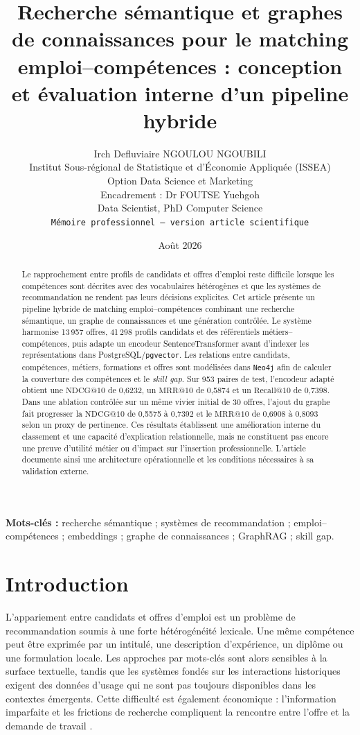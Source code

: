 \documentclass[10pt]{article}
\title{\textbf{Recherche sémantique et graphes de connaissances pour le matching emploi--compétences : conception et évaluation interne d'un pipeline hybride}}
\author{Irch Defluviaire NGOULOU NGOUBILI\\
\small Institut Sous-régional de Statistique et d'Économie Appliquée (ISSEA)\\
\small Option Data Science et Marketing\\
\small Encadrement : Dr FOUTSE Yuehgoh\\
\small Data Scientist, PhD Computer Science\\
\small \texttt{Mémoire professionnel -- version article scientifique}}
\date{Août 2026}
\makeatletter
\newcommand{\pgvector}{\texttt{pgvector}}
\newcommand{\neo}{\texttt{Neo4j}}
\newcommand{\ndcg}{\ensuremath{\mathrm{NDCG@10}}}
\newcommand{\mrr}{\ensuremath{\mathrm{MRR@10}}}
\newcommand{\recall}{\ensuremath{\mathrm{Recall@10}}}
\makeatother
\begin{document}
\maketitle

\begin{abstract}
Le rapprochement entre profils de candidats et offres d'emploi reste difficile lorsque les compétences sont décrites avec des vocabulaires hétérogènes et que les systèmes de recommandation ne rendent pas leurs décisions explicites. Cet article présente un pipeline hybride de matching emploi--compétences combinant une recherche sémantique, un graphe de connaissances et une génération contrôlée. Le système harmonise 13\,957 offres, 41\,298 profils candidats et des référentiels métiers--compétences, puis adapte un encodeur SentenceTransformer avant d'indexer les représentations dans PostgreSQL/\pgvector{}. Les relations entre candidats, compétences, métiers, formations et offres sont modélisées dans \neo{} afin de calculer la couverture des compétences et le \textit{skill gap}. Sur 953 paires de test, l'encodeur adapté obtient une \ndcg{} de 0,6232, un \mrr{} de 0,5874 et un \recall{} de 0,7398. Dans une ablation contrôlée sur un même vivier initial de 30 offres, l'ajout du graphe fait progresser la \ndcg{} de 0,5575 à 0,7392 et le \mrr{} de 0,6908 à 0,8093 selon un proxy de pertinence. Ces résultats établissent une amélioration interne du classement et une capacité d'explication relationnelle, mais ne constituent pas encore une preuve d'utilité métier ou d'impact sur l'insertion professionnelle. L'article documente ainsi une architecture opérationnelle et les conditions nécessaires à sa validation externe.
\end{abstract}

\noindent\textbf{Mots-clés :} recherche sémantique ; systèmes de recommandation ; emploi--compétences ; embeddings ; graphe de connaissances ; GraphRAG ; skill gap.

\twocolumn

\section{Introduction}
L'appariement entre candidats et offres d'emploi est un problème de recommandation soumis à une forte hétérogénéité lexicale. Une même compétence peut être exprimée par un intitulé, une description d'expérience, un diplôme ou une formulation locale. Les approches par mots-clés sont alors sensibles à la surface textuelle, tandis que les systèmes fondés sur les interactions historiques exigent des données d'usage qui ne sont pas toujours disponibles dans les contextes émergents. Cette difficulté est également économique : l'information imparfaite et les frictions de recherche compliquent la rencontre entre l'offre et la demande de travail \citep{akerlof1970lemons,spence1973job,mortensen1994job,pissarides2000equilibrium}.
\end{document}
